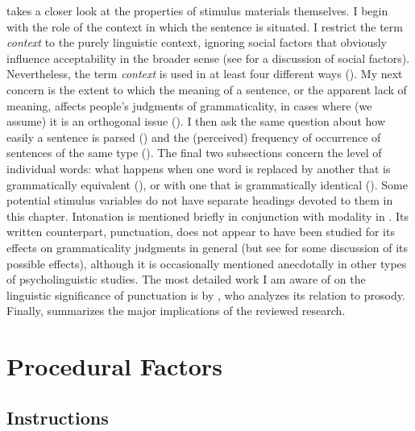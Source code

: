  takes a closer look at the properties of stimulus materials themselves. I begin with the role of the context in which the sentence is situated. I restrict the term \textit{context} to the purely linguistic context, ignoring social factors that obviously influence acceptability in the broader sense (see \citet{vanDijk1977} for a discussion of social factors). Nevertheless, the term \textit{context} is used in at least four different ways (). My next concern is the extent to which the meaning of a sentence, or the apparent lack of meaning, affects people's judgments of grammaticality, in cases where (we assume) it is an orthogonal issue (). I then ask the same question about how easily a sentence is parsed () and the (perceived) frequency of occurrence of sentences of the same type (). The final two subsections concern the level of individual words: what happens when one word is replaced by another that is grammatically equivalent (), or with one that is grammatically identical (). Some potential stimulus variables do not have separate headings devoted to them in this chapter. Intonation is mentioned briefly in conjunction with modality in . Its written counterpart, punctuation, does not appear to have been studied for its effects on grammaticality judgments in general (but see \citet{Levelt1974} for some discussion of its possible effects), although it is occasionally mentioned anecdotally in other types of psycholinguistic studies. The most detailed work I am aware of on the linguistic significance of punctuation is by \citet{Steegar1975}, who analyzes its relation to prosody. Finally,  summarizes the major implications of the reviewed research.

\section{Procedural Factors}\label{sec:5.2}

\subsection{Instructions}\label{sec:5.2.1}

